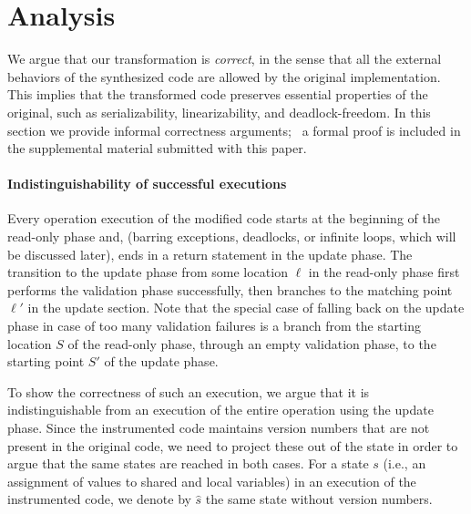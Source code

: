\newcommand{\op}{\emph{\textsc{op}}}
\newcommand{\opt}{\textsc{opt}}

\section{Analysis}
\label{sec:proof}


We argue that our transformation is \emph{correct}, in the sense that all the external behaviors of
the synthesized code are allowed by the original implementation.
This implies that the transformed code preserves essential properties of the original, such as serializability,
linearizability, and deadlock-freedom.
In this section we provide informal correctness arguments;\  
%
{
a formal proof is included in the supplemental material submitted with this paper.
}


\paragraph{Indistinguishability of successful executions}
Every operation execution of the modified code starts at the beginning of the read-only phase and,
(barring exceptions, deadlocks, or infinite loops, which will be discussed later),
ends in a return statement in the update phase. The transition to the update phase
from some location $\ell$ in the read-only phase first performs the validation phase successfully, then branches
to the matching point $\ell'$ in the update section. Note that the special case of falling back on the update phase in case of too
many validation failures is a branch from the starting location $S$ of the read-only phase,
through an empty validation phase, to the starting point $S'$ of the update phase.

To show the correctness of such an execution, we argue that it is indistinguishable from an execution of the entire
operation using the  update phase. Since the instrumented code maintains version numbers that are not present in
the original code, we need to project these out of the state in order to argue that the same states are reached in
both cases. For a state $s$ (i.e., an assignment of values to shared and local variables) in an execution
of the instrumented code, we denote by $\hat{s}$ the same state without version numbers.

